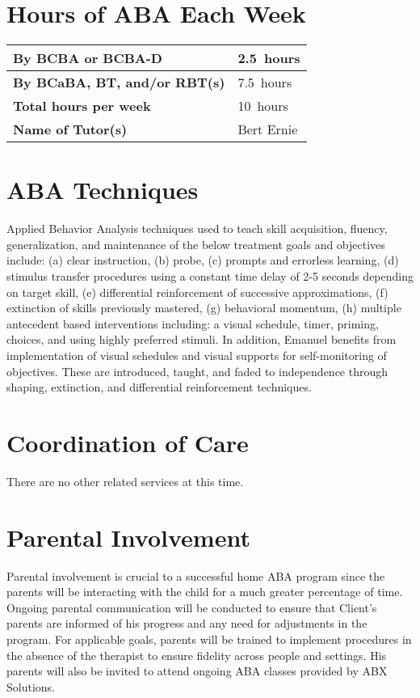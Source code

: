 \documentclass{article}
\def\clientfirstname{Client}
\def\BCBAhours{2.5}
\def\tutorhours{7.5}
\def\totalhours{10}
\def\tutor{Bert Ernie}
\begin{document}
\section{Hours of ABA Each Week}

	\begin{tabular}{|l||l|} 
		\hline
		\textbf{By BCBA or BCBA-D} & \BCBAhours\ hours\\
		\hline
		\textbf{By BCaBA, BT, and/or RBT(s)} &  \tutorhours\ hours\\
		\hline
		\textbf{Total hours per week} & \totalhours\ hours\\
		\hline
		\textbf{Name of Tutor(s)} & \tutor \\
		\hline
	\end{tabular}

\section{ABA Techniques}
Applied Behavior Analysis techniques used to teach skill acquisition, fluency, generalization, and maintenance of the below treatment goals and objectives include: (a) clear instruction, (b) probe, (c) prompts and errorless learning, (d) stimulus transfer procedures using a constant time delay of 2-5 seconds depending on target skill, (e) differential reinforcement of successive approximations, (f) extinction of skills previously mastered, (g) behavioral momentum, (h) multiple antecedent based interventions including: a visual schedule, timer, priming, choices, and using highly preferred stimuli. In addition, Emanuel benefits from implementation of visual schedules and visual supports for self-monitoring of objectives.  These are introduced, taught, and faded to independence through shaping, extinction, and differential reinforcement techniques. 

\section{Coordination of Care}
There are no other related services at this time.

\section{Parental Involvement}
Parental involvement is crucial to a successful home ABA program since the parents will be interacting with the child for a much greater percentage of time.  Ongoing parental communication will be conducted to ensure that \clientfirstname’s parents are informed of his progress and any need for adjustments in the program.  For applicable goals, parents will be trained to implement procedures in the absence of the therapist to ensure fidelity across people and settings.  His parents will also be invited to attend ongoing ABA classes provided by ABX Solutions.
\end{document}
